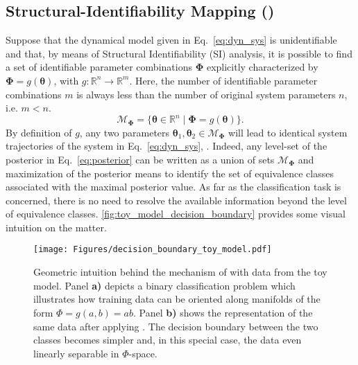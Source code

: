 \subsection{Structural-Identifiability Mapping (\myMethod{})}
Suppose that the dynamical model given in Eq.~\eqref{eq:dyn_sys} is unidentifiable and that, by means of Structural Identifiability (SI) analysis, it is possible to find a set of identifiable parameter combinations $\boldsymbol{\Phi}$ explicitly characterized by $\boldsymbol{\Phi} = g(\boldsymbol{\theta})$, with $g: \mathbb{R}^{n} \rightarrow \mathbb{R}^{m}$. 
Here, the number of identifiable parameter combinations $m$ is always less than the number of original system parameters $n$, i.e. $m < n$. 
\begin{equation}
    \mathcal{M}_{\boldsymbol{\Phi}} = \{ \boldsymbol{\theta} \in \mathbb{R}^{n} \mid \boldsymbol{\Phi} = g(\boldsymbol{\theta}) \}.
\end{equation}
By definition of $g$, any two parameters $\boldsymbol{\theta}_{1}, \boldsymbol{\theta}_{2} \in \mathcal{M}_{\boldsymbol{\Phi}}$ will lead to identical system trajectories of the system in Eq.~\eqref{eq:dyn_sys}, . 
Indeed, any level-set of the posterior in Eq.~\eqref{eq:posterior} can be written as a union of sets $\mathcal{M}_{\boldsymbol{\Phi}}$ and maximization of the posterior means to identify the set of equivalence classes associated with the maximal posterior value.
As far as the classification task is concerned, there is no need to resolve the available information beyond the level of equivalence classes.
\autoref{fig:toy_model_decision_boundary} provides some visual intuition on the matter.
\begin{figure}[t!]
    \centering
    \texttt{[image: Figures/decision\_boundary\_toy\_model.pdf]}
    \caption{Geometric intuition behind the mechanism of \myMethod{} with data from the toy model. Panel \textbf{a)} depicts a binary classification problem which illustrates how training data can be oriented along manifolds of the form $\Phi = g(a,b) = a b$. Panel \textbf{b)} shows the representation of the same data after applying \myMethod{}. The decision boundary between the two classes becomes simpler and, in this special case, the data even  linearly separable in $\Phi$-space.}
    \label{fig:toy_model_decision_boundary}
\end{figure}
